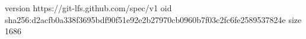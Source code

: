 version https://git-lfs.github.com/spec/v1
oid sha256:d2acfb0a338f3695bdf90f51e92e2b27970cb0960b7f03c2fc6fe2589537824e
size 1686
